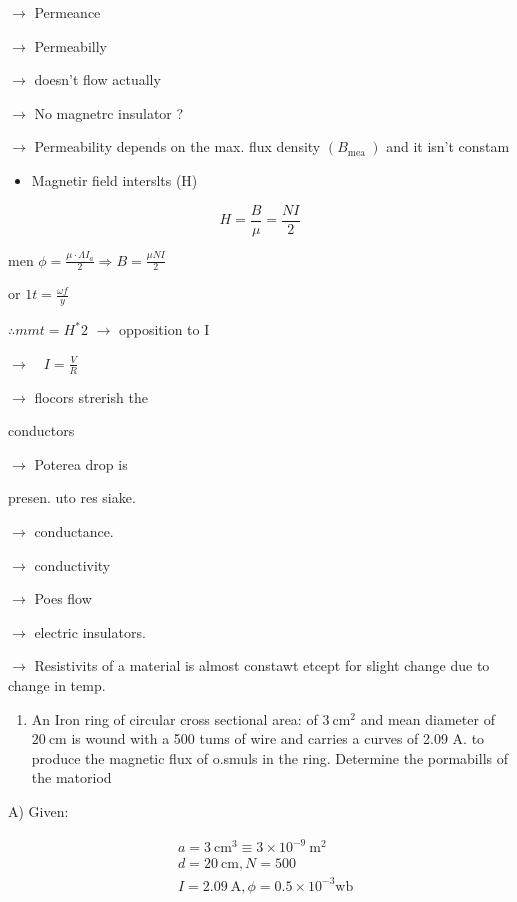 \documentclass[12pt, a4paper]{article}
\begin{document}
$\rightarrow$ Permeance

$\rightarrow$ Permeabilly

$\rightarrow$ doesn't flow actually

$\rightarrow$ No magnetrc insulator ?

$\rightarrow$ Permeability depends on the max. flux density $\left(B_{\text {mea }}\right)$ and it isn't constam

\begin{itemize}
	\item Magnetir field interslts (H)
\end{itemize}

$$
	H=\frac{B}{\mu}=\frac{N I}{2}
$$

men $\phi=\frac{\mu \cdot \Lambda I_{a}}{2} \Rightarrow B=\frac{\mu N I}{2}$

or $1 t=\frac{\omega f}{y}$

$\therefore m m t=H^{*} 2$ $\rightarrow$ opposition to I

$\rightarrow \quad I=\frac{V}{R}$

$\rightarrow$ flocors strerish the

conductors

$\rightarrow$ Poterea drop is

presen. uto res siake.

$\rightarrow$ conductance.

$\rightarrow$ conductivity

$\rightarrow$ Poes flow

$\rightarrow$ electric insulators.

$\rightarrow$ Resistivits of a material is almost constawt etcept for slight change due to change in temp.

\begin{enumerate}
	\item An Iron ring of circular cross sectional area: of $3 \mathrm{~cm}^{2}$ and mean diameter of $20 \mathrm{~cm}$ is wound with a 500 tums of wire and carries a curves of 2.09 A. to produce the magnetic flux of o.smuls in the ring. Determine the pormabills of the matoriod
\end{enumerate}

A) Given:

$$
	\begin{aligned}
		 & a=3 \mathrm{~cm}^{3} \equiv 3 \times 10^{-9} \mathrm{~m}^{2} \\
		 & d=20 \mathrm{~cm}, N=500                                     \\
		 & I=2.09 \mathrm{~A}, \phi=0.5 \times 10^{-3} \mathrm{wb}
	\end{aligned}
$$
\end{document}
